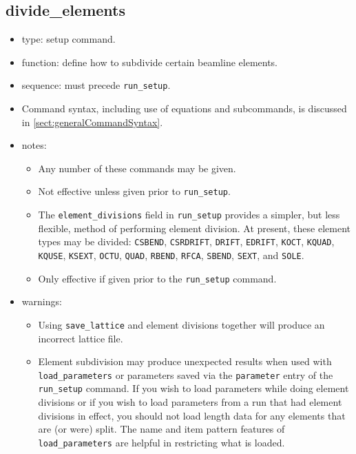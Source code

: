 \documentclass[11pt]{article}
\begin{document}
\subsection{divide\_elements \label{subsec:divideelements}}

\begin{itemize}
\item type: setup command.
\item function: define how to subdivide certain beamline elements.
\item sequence: must precede \verb|run_setup|.
\item Command syntax, including use of equations and subcommands, is discussed in \ref{sect:generalCommandSyntax}.
\item notes: 
	\begin{itemize}
	\item Any number of these commands may be given.  
	\item Not effective unless given prior to \verb|run_setup|.
	\item The \verb|element_divisions|
 field in \verb|run_setup| provides a simpler, but less flexible, method of performing
 element division.  At present, these element types may be divided: 
\verb|CSBEND|, 
\verb|CSRDRIFT|,
\verb|DRIFT|,
\verb|EDRIFT|,
\verb|KOCT|,
\verb|KQUAD|,
\verb|KQUSE|,
\verb|KSEXT|,
\verb|OCTU|,
\verb|QUAD|,
\verb|RBEND|,
\verb|RFCA|,
\verb|SBEND|,
\verb|SEXT|,
and \verb|SOLE|.
	\item Only effective if given prior to the \verb|run_setup| command.
	\end{itemize}
\item warnings:	
	\begin{itemize}
	\item Using \verb|save_lattice| and element divisions together will
	produce an incorrect lattice file.
	\item Element subdivision may
	produce unexpected results when used with \verb|load_parameters|
	or parameters saved via the \verb|parameter|
	entry of the \verb|run_setup| command.
	If you wish to load parameters while doing element divisions or if
	you wish to load parameters from a run that had element divisions
	in effect, you should not load length data for any elements that
	are (or were) split.  The name and item pattern features of 
	\verb|load_parameters| are helpful in restricting what is loaded.
	\end{itemize}
\end{itemize}
\end{document}
